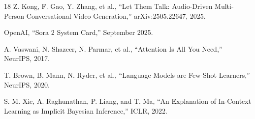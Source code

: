 \documentclass[10pt,twocolumn]{article}
\begin{document}
\begin{thebibliography}{18}
Z. Kong, F. Gao, Y. Zhang, et al.,
``Let Them Talk: Audio-Driven Multi-Person Conversational Video Generation,''
arXiv:2505.22647, 2025.

OpenAI,
``Sora 2 System Card,''
September 2025.

A. Vaswani, N. Shazeer, N. Parmar, et al.,
``Attention Is All You Need,''
NeurIPS, 2017.

T. Brown, B. Mann, N. Ryder, et al.,
``Language Models are Few-Shot Learners,''
NeurIPS, 2020.

S. M. Xie, A. Raghunathan, P. Liang, and T. Ma,
``An Explanation of In-Context Learning as Implicit Bayesian Inference,''
ICLR, 2022.

\end{thebibliography}
\end{document}
